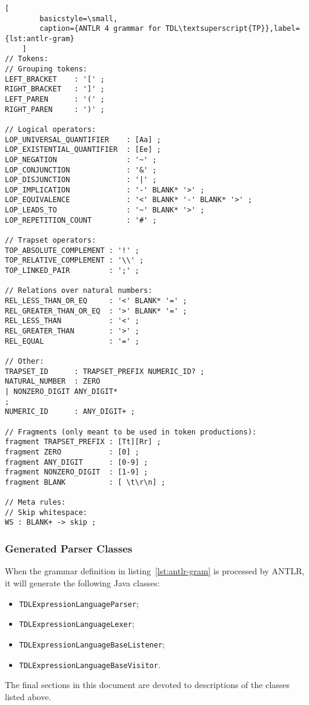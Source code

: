 \documentclass[12pt,oneside,a4paper,notitlepage]{report}
\begin{document}
\begin{lstlisting}[
		basicstyle=\small,
		caption={ANTLR 4 grammar for TDL\textsuperscript{TP}},label={lst:antlr-gram}
	]
// Tokens:
// Grouping tokens:
LEFT_BRACKET    : '[' ;
RIGHT_BRACKET   : ']' ;
LEFT_PAREN      : '(' ;
RIGHT_PAREN     : ')' ;

// Logical operators:
LOP_UNIVERSAL_QUANTIFIER    : [Aa] ;
LOP_EXISTENTIAL_QUANTIFIER  : [Ee] ;
LOP_NEGATION                : '~' ;
LOP_CONJUNCTION             : '&' ;
LOP_DISJUNCTION             : '|' ;
LOP_IMPLICATION             : '-' BLANK* '>' ;
LOP_EQUIVALENCE             : '<' BLANK* '-' BLANK* '>' ;
LOP_LEADS_TO                : '~' BLANK* '>' ;
LOP_REPETITION_COUNT        : '#' ;

// Trapset operators:
TOP_ABSOLUTE_COMPLEMENT : '!' ;
TOP_RELATIVE_COMPLEMENT : '\\' ;
TOP_LINKED_PAIR         : ';' ;

// Relations over natural numbers:
REL_LESS_THAN_OR_EQ     : '<' BLANK* '=' ;
REL_GREATER_THAN_OR_EQ  : '>' BLANK* '=' ;
REL_LESS_THAN           : '<' ;
REL_GREATER_THAN        : '>' ;
REL_EQUAL               : '=' ;

// Other:
TRAPSET_ID      : TRAPSET_PREFIX NUMERIC_ID? ;
NATURAL_NUMBER  : ZERO
| NONZERO_DIGIT ANY_DIGIT*
;
NUMERIC_ID      : ANY_DIGIT+ ;

// Fragments (only meant to be used in token productions):
fragment TRAPSET_PREFIX : [Tt][Rr] ;
fragment ZERO           : [0] ;
fragment ANY_DIGIT      : [0-9] ;
fragment NONZERO_DIGIT  : [1-9] ;
fragment BLANK          : [ \t\r\n] ;

// Meta rules:
// Skip whitespace:
WS : BLANK+ -> skip ;
	\end{lstlisting}

	\subsubsection*{Generated Parser Classes}
	\par When the grammar definition in listing~\ref{lst:antlr-gram} is processed by ANTLR, it will generate the following Java classes:
	\begin{itemize}
		\item \texttt{TDLExpressionLanguageParser};
		\item \texttt{TDLExpressionLanguageLexer};
		\item \texttt{TDLExpressionLanguageBaseListener};
		\item \texttt{TDLExpressionLanguageBaseVisitor}.
	\end{itemize}

	\par The final sections in this document are devoted to descriptions of the classes listed above.
\end{document}
